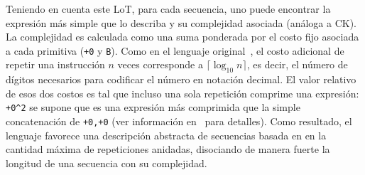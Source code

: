 Teniendo en cuenta este LoT, para cada secuencia, uno puede encontrar la expresión más simple que lo describa y su complejidad asociada (análoga a CK). La complejidad es calculada como una suma ponderada por el costo fijo asociada a cada primitiva (\verb#+0# y \verb#B#). Como en el lenguaje original~\cite{amalric2017language}, el costo adicional de repetir una instrucción $n$ veces corresponde a $\lceil \log_{10} n \rceil$, es decir, el número de dígitos necesarios para codificar el número en notación decimal. El valor relativo de esos dos costos es tal que incluso una sola repetición comprime una expresión: \verb#+0^2# se supone que es una expresión más comprimida que la simple concatenación de \verb#+0,+0# (ver información en~\cite{amalric2017language} para detalles). Como resultado, el lenguaje favorece una descripción abstracta de secuencias basada en en la cantidad máxima de repeticiones anidadas, disociando de manera fuerte la longitud de una secuencia con su complejidad.
\color{black}
